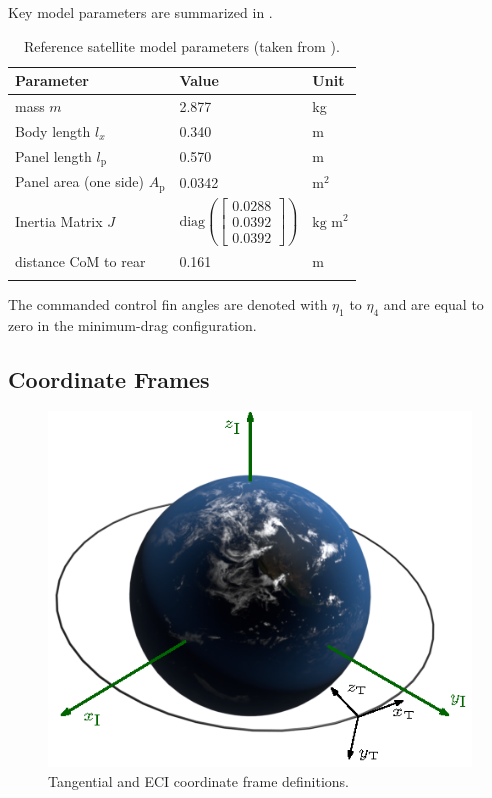 \documentclass[pdflatex,sn-mathphys-num]{sn-jnl}%
\theoremstyle{thmstyleone}%
\theoremstyle{thmstyletwo}%
\theoremstyle{thmstylethree}%
\begin{document}
    Key model parameters are summarized in . 
		\begin{table}[ht]
			\caption{Reference satellite model parameters (taken from \cite{livadiottiApplicationOrbitalAerodynamics2021}).}	
			\footnotesize{
			\begin{tabular}{lll}
				\hline
				\textbf{Parameter}      & \textbf{Value} & \textbf{Unit} \\
				\hline
				mass $m$              			& 2.877 & kg \\
				Body length $l_x$     			& 0.340 & m\\
				Panel length $l_{\text{p}}$     		& 0.570 & m\\
				Panel area (one side) $A_{\text{p}}$   & 0.0342 & m$^2$\\
				Inertia Matrix $J$  & $\text{diag} \left(
				\begin{bmatrix}0.0288 \\ 0.0392 \\ 0.0392
				\end{bmatrix}\right)$ & $\text{kg m}^2$\\
				distance CoM to rear& 0.161 & m\\
				\hline& 
			\end{tabular}
			\label{tab:soar_parameters}
			}
		\end{table}
		The commanded control fin angles are denoted with $\eta_1$ to $\eta_4$ and are equal to zero in the minimum-drag configuration.

    \subsection{Coordinate Frames}
		\begin{figure}[h]
            \centering
			\includegraphics[scale=1]{Figures/fig2.eps}
			\caption{Tangential and ECI coordinate frame definitions.} %
			\label{fig:tangential_coordinate_frame}
		\end{figure}
		
\end{document}
